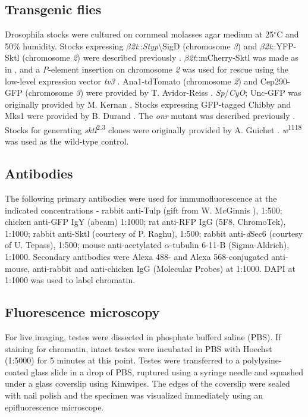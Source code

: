 \documentclass[12pt, twoside, letterpaper]{article}
\begin{document}
\begin{doublespacing}
\begin{linenumbers}
    \subsection{Transgenic flies}
    Drosophila stocks were cultured on cornmeal molasses agar medium at 25$^{\circ}$C
    and 50\% humidity.
    Stocks expressing $\beta$\textit{2t}::\textit{Styp}\textbackslash{SigD} (chromosome \textit{3})
    and $\beta$\textit{2t}::YFP-Sktl (chromosome \textit{2})
    were described previously \citep{wei2008depletion, fabian2010phosphatidylinositol}.
    $\beta$\textit{2t}::mCherry-Sktl was made as in \citep{wei2008depletion},
    and a \textit{P}-element insertion on chromosome \textit{2} was used for rescue using the low-level
    expression vector \textit{tv3} \citep{wong2005pip2}.
    Ana1-tdTomato (chromosome \textit{2}) and Cep290-GFP (chromosome \textit{3}) were provided
    by T. Avidor-Reiss \citep{basiri2014migrating}.
    \textit{Sp}/\textit{CyO}; Unc-GFP was originally provided by M. Kernan \citep{baker2004mechanosensory}.
    Stocks expressing GFP-tagged Chibby and Mks1 were
    provided by B. Durand \citep{enjolras2012drosophila, vieillard2016transition}.
    The \textit{onr} mutant was described previously \citep{giansanti2015exocyst}.
    Stocks for generating \textit{sktl}\textsuperscript{2.3} clones were originally provided by
    A. Guichet \citep{gervais2008pip5k}.
    \textit{w}\textsuperscript{1118} was used as the wild-type control.

    \subsection{Antibodies}
    The following primary antibodies were used for immunofluorescence
    at the indicated concentrations -
    rabbit anti-Tulp (gift from W. McGinnis \citep{ronshaugen2002structure}), 1:500;
    chicken anti-GFP IgY (abcam) 1:1000;
    rat anti-RFP IgG (5F8, ChromoTek), 1:1000;
    rabbit anti-Sktl (courtesy of P. Raghu), 1:500;
    rabbit anti-\textit{d}Sec6 (courtesy of U. Tepass), 1:500;
    mouse anti-acetylated $\alpha$-tubulin 6-11-B (Sigma-Aldrich), 1:1000.
    Secondary antibodies were Alexa 488- and Alexa 568-conjugated
    anti-mouse, anti-rabbit and anti-chicken
    IgG (Molecular Probes) at 1:1000.
    DAPI at 1:1000 was used to label chromatin.

    \subsection{Fluorescence microscopy}
    For live imaging, testes were dissected in phosphate bufferd saline (PBS).
    If staining for chromatin, intact testes were incubated in PBS with
    Hoechst (1:5000) for 5 minutes at this point.
    Testes were transferred to a polylysine-coated glass slide in a drop of PBS,
    ruptured using a syringe needle and
    squashed under a glass coverslip using Kimwipes.
    The edges of the coverslip were sealed with nail polish
    and the specimen was visualized immediately using an epifluorescence microscope.


\end{linenumbers}
\end{doublespacing}
\end{document}
